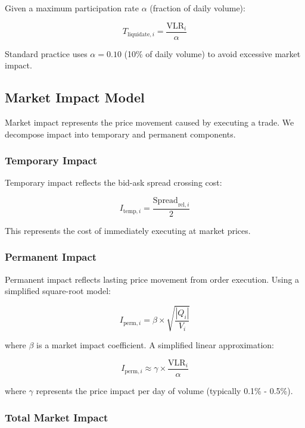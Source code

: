 \documentclass[11pt,a4paper]{article}
\begin{document}
Given a maximum participation rate $\alpha$ (fraction of daily volume):

\begin{equation}
T_{\text{liquidate},i} = \frac{\text{VLR}_i}{\alpha}
\end{equation}

Standard practice uses $\alpha = 0.10$ (10\% of daily volume) to avoid excessive market impact.

\subsection{Market Impact Model}

Market impact represents the price movement caused by executing a trade. We decompose impact into temporary and permanent components.

\subsubsection{Temporary Impact}

Temporary impact reflects the bid-ask spread crossing cost:

\begin{equation}
I_{\text{temp},i} = \frac{\text{Spread}_{\text{rel},i}}{2}
\end{equation}

This represents the cost of immediately executing at market prices.

\subsubsection{Permanent Impact}

Permanent impact reflects lasting price movement from order execution. Using a simplified square-root model:

\begin{equation}
I_{\text{perm},i} = \beta \times \sqrt{\frac{|Q_i|}{V_i}}
\end{equation}

where $\beta$ is a market impact coefficient. A simplified linear approximation:

\begin{equation}
I_{\text{perm},i} \approx \gamma \times \frac{\text{VLR}_i}{\alpha}
\end{equation}

where $\gamma$ represents the price impact per day of volume (typically 0.1\% - 0.5\%).

\subsubsection{Total Market Impact}
\end{document}
